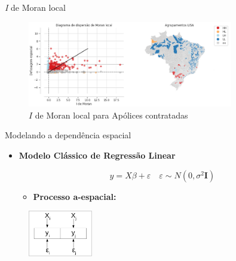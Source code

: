 \documentclass[aspectratio=169]{beamer}
\begin{document}
\begin{frame}{\textit{I} de Moran local}
	\begin{figure}
		\centering
		\includegraphics[width=0.8\textwidth]{img/lisa.png}
		\caption{$I$ de Moran local para Apólices contratadas}
		\label{fig:1}
	\end{figure}
\end{frame}

\begin{frame}{Modelando a dependência espacial}
    \begin{itemize}
        \item \textbf{Modelo Clássico de Regressão Linear}
        \vspace{0.5cm}
        \begin{block}{}
            $$y = X\beta + \varepsilon \quad \varepsilon\sim N(0,\sigma^2 \textbf{I})$$
        \end{block}
        \begin{itemize}
            \item \textbf{Processo a-espacial:}
        \end{itemize}
    \end{itemize}
    \begin{figure}
		\centering
		\includegraphics[width=0.25\textwidth]{img/reg_mcrl.png}
	\end{figure}
\end{frame}
\end{document}
